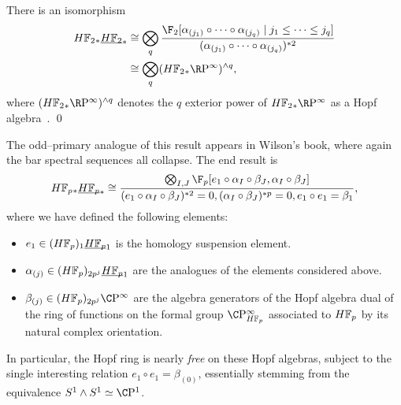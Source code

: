 \begin{corollary}\label{CalculationOfUnstableSteenrodHopfRing}
There is an isomorphism
\begin{align*}
\HFtwo_* \OS{\HFtwo}{*} & \cong \bigotimes_q \frac{\F_2[\alpha_{(j_1)} \circ \cdots \circ \alpha_{(j_q)} \mid j_1 \le \cdots \le j_q]}{(\alpha_{(j_1)} \circ \cdots \circ \alpha_{(j_q)})^{\ast 2}} \\
& \cong \bigotimes_q (\HFtwo_* \RP^\infty)^{\sm q},
\end{align*}
where \((\HFtwo_* \RP^\infty)^{\sm q}\) denotes the \(q\){\th} exterior power of \(\HFtwo_* \RP^\infty\) as a Hopf algebra~\cite[Propposition 5.5]{GoerssDieudonne}. \qed
\end{corollary}

\begin{remark}
The odd--primary analogue of this result appears in Wilson's book, where again the bar spectral sequences all collapse.
The end result is \[\HFp_* \OS{\HFp}{*} \cong \frac{\bigotimes_{I, J} \F_p[e_1 \circ \alpha_I \circ \beta_J, \alpha_I \circ \beta_J]}{(e_1 \circ \alpha_I \circ \beta_J)^{\ast 2} = 0, (\alpha_I \circ \beta_J)^{\ast p} = 0, e_1 \circ e_1 = \beta_1},\] where we have defined the following elements:
\begin{itemize}
\item \(e_1 \in (\HFp)_1 \OS{\HFp}{1}\) is the homology suspension element.
\item \(\alpha_{(j)} \in (\HFp)_{2p^j} \OS{\HFp}{1}\) are the analogues of the elements considered above.
\item \(\beta_{(j)} \in (\HFp)_{2p^j} \CP^\infty\) are the algebra generators of the Hopf algebra dual of the ring of functions on the formal group \(\CP^\infty_{\HFp}\) associated to \(\HFp\) by its natural complex orientation.
\end{itemize}
In particular, the Hopf ring is nearly \emph{free} on these Hopf algebras, subject to the single interesting relation \(e_1 \circ e_1 = \beta_{(0)}\), essentially stemming from the equivalence \(S^1 \sm S^1 \simeq \CP^1\).
\end{remark}

